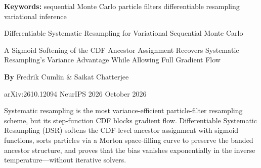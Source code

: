 \documentclass[10pt,twocolumn]{article}
\begin{document}
\setlength{\parindent}{0pt}
\setlength{\parskip}{4pt}

{\small\color{keywordgray}\textbf{Keywords:}
  sequential Monte Carlo \textbullet{}
  particle filters \textbullet{}
  differentiable resampling \textbullet{}
  variational inference}\par\vspace{4pt}

{\LARGE\bfseries\raggedright
  Differentiable Systematic Resampling for Variational Sequential Monte Carlo}\par\vspace{4pt}

{\large\itshape\raggedright
  A Sigmoid Softening of the CDF Ancestor Assignment Recovers Systematic
  Resampling's Variance Advantage While Allowing Full Gradient Flow}\par\vspace{6pt}

{\small\textbf{By} Fredrik Cumlin \& Saikat Chatterjee}\par\vspace{2pt}

{\small\color{keywordgray}arXiv:2610.12094 \textbullet{} NeurIPS 2026 \textbullet{} October 2026}
\par\vspace{2pt}\noindent{\color{rulered}\rule{\columnwidth}{0.6pt}}\vspace{6pt}

Systematic resampling is the most variance-efficient particle-filter
resampling scheme, but its step-function CDF blocks gradient flow.
Differentiable Systematic Resampling (DSR) softens the CDF-level ancestor
assignment with sigmoid functions, sorts particles via a Morton space-filling
curve to preserve the banded ancestor structure, and proves that the bias
vanishes exponentially in the inverse temperature---without iterative solvers.
\end{document}
